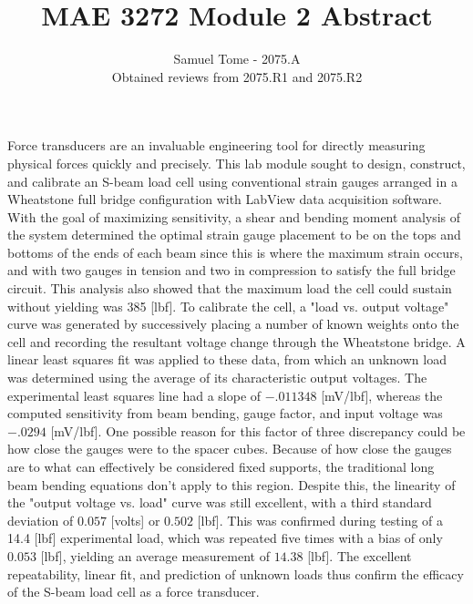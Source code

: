 \documentclass[11pt]{article}
\begin{document}
 

 
\title{MAE 3272 Module 2 Abstract}
\author{Samuel Tome - 2075.A \\ Obtained reviews from 2075.R1 and 2075.R2}
\maketitle



Force transducers are an invaluable engineering tool for directly measuring physical forces quickly and precisely.  This lab module sought to design, construct, and calibrate an S-beam load cell using conventional strain gauges arranged in a Wheatstone full bridge configuration with LabView data acquisition software.  With the goal of maximizing sensitivity, a shear and bending moment analysis of the system determined the optimal strain gauge placement to be on the tops and bottoms of the ends of each beam since this is where the maximum strain occurs, and with two gauges in tension and two in compression to satisfy the full bridge circuit.  This analysis also showed that the maximum load the cell could sustain without yielding was 385 [lbf].  To calibrate the cell, a "load vs. output voltage" curve was generated by successively placing a number of known weights onto the cell and recording the resultant voltage change through the Wheatstone bridge.  A linear least squares fit was applied to these data, from which an unknown load was determined using the average of its characteristic output voltages.  The experimental least squares line had a slope of $-.011348 $ [mV/lbf], whereas the computed sensitivity from beam bending, gauge factor, and input voltage was $ -.0294 $ [mV/lbf].  One possible reason for this factor of three discrepancy could be how close the gauges were to the spacer cubes.  Because of how close the gauges are to what can effectively be considered fixed supports, the traditional long beam bending equations don't apply to this region.  Despite this, the linearity of the "output voltage vs. load" curve was still excellent, with a third standard deviation of $0.057$ [volts] or $0.502$ [lbf].  This was confirmed during testing of a 14.4 [lbf] experimental load, which was repeated five times with a bias of only $0.053$ [lbf], yielding an average measurement of $14.38$ [lbf].  The excellent repeatability, linear fit, and prediction of unknown loads thus confirm the efficacy of the S-beam load cell as a force transducer.
\end{document}
